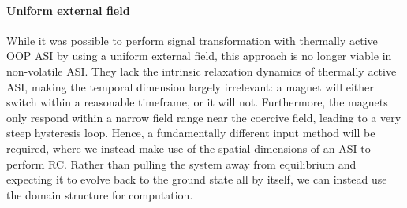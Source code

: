 \paragraph{Uniform external field}
While it was possible to perform signal transformation with thermally active OOP ASI by using a uniform external field, this approach is no longer viable in non-volatile ASI.
They lack the intrinsic relaxation dynamics of thermally active ASI, making the temporal dimension largely irrelevant: a magnet will either switch within a reasonable timeframe, or it will not.
Furthermore, the magnets only respond within a narrow field range near the coercive field, leading to a very steep hysteresis loop.
Hence, a fundamentally different input method will be required, where we instead make use of the spatial dimensions of an ASI to perform RC.
Rather than pulling the system away from equilibrium and expecting it to evolve back to the ground state all by itself, we can instead use the domain structure for computation.

